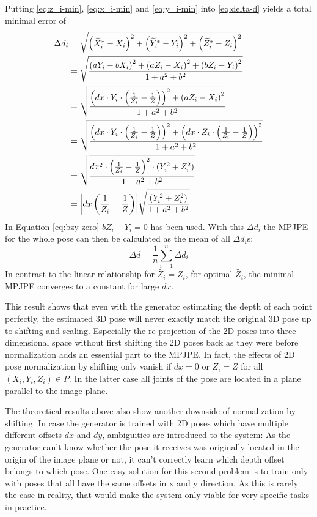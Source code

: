 Putting \eqref{eq:z_i-min}, \eqref{eq:x_i-min} and \eqref{eq:y_i-min} into \eqref{eq:delta-d} yields a total minimal error of 
\begin{align}
	\Delta d_i &= 
	\sqrt{\left (\widetilde{X}_i^\ast - X_i \right )^2 + \left (\widetilde{Y}_i^\ast - Y_i \right )^2 + \left (\widetilde{Z}_i^\ast - Z_i \right )^2}\\
	& = \sqrt{\frac{\left (a Y_i - b X_i \right )^2 + \left (a Z_i - X_i \right )^2 + \left (b Z_i - Y_i \right )^2}{1 + a^2 + b^2}} \\
	\label{eq:bzy-zero}
	&= \sqrt{\frac{\left (dx \cdot Y_i \cdot \left (\frac{1}{Z_i} - \frac{1}{Z} \right) \right)^2 + \left (a Z_i - X_i \right )^2}{1 + a^2 + b^2}}\\
	& = \sqrt{\frac{\left (dx \cdot Y_i \cdot \left (\frac{1}{Z_i} - \frac{1}{Z} \right ) \right)^2 + \left (dx \cdot Z_i \cdot \left (\frac{1}{Z_i} - \frac{1}{Z} \right ) \right)^2}{1 + a^2 + b^2}} \\
	& = \sqrt{\frac{dx^2 \cdot \left (\frac{1}{Z_i} - \frac{1}{Z} \right )^2 \cdot \left (Y_i^2 + Z_i^2 \right ) }{1 + a^2 + b^2}}\\
	\label{eq:minimum-delta-d}
	& = \abs{dx \left (\frac{1}{Z_i} - \frac{1}{Z} \right )} \sqrt{\frac{(Y_i^2 + Z_i^2)}{1 + a^2 + b^2}} \ .
\end{align}
In Equation \eqref{eq:bzy-zero} $b Z_i - Y_i = 0$ has been used.
With this $\Delta d_i$ the MPJPE for the whole pose can then be calculated as the mean of all $\Delta d_i$s:
\begin{equation}
	\label{eq:minimum-mpjpe-on-shift}
	\Delta d = \frac{1}{n} \sum_{i = 1}^{n} \Delta d_i 
\end{equation}
In contrast to the linear relationship for $\widetilde{Z_i} = Z_i$, for optimal $\widetilde{Z_i}$, the minimal MPJPE converges to a constant for large $dx$.

This result shows that even with the generator estimating the depth of each point perfectly, the estimated 3D pose will never exactly match the original 3D pose up to shifting and scaling.
Especially the re-projection of the 2D poses into three dimensional space without first shifting the 2D poses back as they were before normalization adds an essential part to the MPJPE.
In fact, the effects of 2D pose normalization by shifting only vanish if $dx = 0$ or $Z_i = Z$ for all $(X_i, Y_i, Z_i) \in P$. In the latter case all joints of the pose are located in a plane parallel to the image plane.

The theoretical results above also show another downside of normalization by shifting.
In case the generator is trained with 2D poses which have multiple different offsets $dx$ and $dy$, ambiguities are introduced to the system:
As the generator can't know whether the pose it receives was originally located in the origin of the image plane or not, it can't correctly learn which depth offset belongs to which pose.
One easy solution for this second problem is to train only with poses that all have the same offsets in x and y direction.
As this is rarely the case in reality, that would make the system only viable for very specific tasks in practice.

